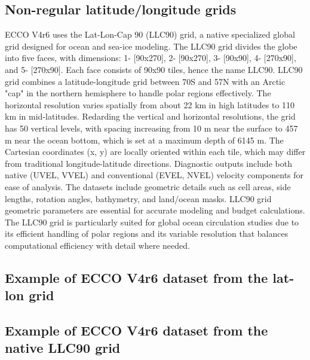 \subsection*{Non-regular latitude/longitude grids}
\par ECCO V4r6 uses the Lat-Lon-Cap 90 (LLC90) grid, a native specialized global grid designed for ocean and sea-ice modeling. The LLC90 grid divides the globe into five faces, with dimensions: 1- [90x270], 2- [90x270], 3- [90x90], 4- [270x90], and 5- [270x90]. Each face consists of 90x90 tiles, hence the name LLC90. LLC90 grid combines a latitude-longitude grid between 70\textdegree S and 57\textdegree N with an Arctic "cap" in the northern hemisphere to handle polar regions effectively. The horizontal resolution varies spatially from about 22 km in high latitudes to 110 km in mid-latitudes. Redarding the vertical and horizontal resolutions, the grid has 50 vertical levels, with spacing increasing from 10 m near the surface to 457 m near the ocean bottom, which is set at a maximum depth of 6145 m. The Cartesian coordinates (x, y) are locally oriented within each tile, which may differ from traditional longitude-latitude directions. Diagnostic outputs include both native (UVEL, VVEL) and conventional (EVEL, NVEL) velocity components for ease of analysis. The datasets include geometric details such as cell areas, side lengths, rotation angles, bathymetry, and land/ocean masks. LLC90 grid geometric parameters are essential for accurate modeling and budget calculations. The LLC90 grid is particularly suited for global ocean circulation studies due to its efficient handling of polar regions and its variable resolution that balances computational efficiency with detail where needed.

\pagebreak
\subsection{Example of ECCO V4r6 dataset from the lat-lon grid}

\pagebreak
\subsection{Example of ECCO V4r6 dataset from the native LLC90 grid}

\pagebreak
